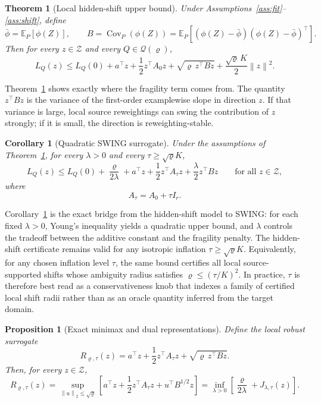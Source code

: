 \documentclass{article}
\newtheorem{theorem}{Theorem}
\newtheorem{proposition}{Proposition}
\newtheorem{corollary}{Corollary}
\newcommand{\EE}{\mathbb{E}}
\newcommand{\cQ}{\mathcal{Q}}
\newcommand{\cZ}{\mathcal{Z}}
\newcommand{\Cov}{\operatorname{Cov}}
\newcommand{\swing}{\textup{\textsc{SWING}}}
\newcommand{\norm}[1]{\left\lVert #1 \right\rVert}
\newcommand{\bracks}[1]{\left[ #1 \right]}
\begin{document}
\begin{theorem}[Local hidden-shift upper bound]
\label{thm:robust_bound}
Under Assumptions~\ref{ass:fit}--\ref{ass:shift}, define
\[
\bar\phi = \EE_P[\phi(Z)],
\qquad
B = \Cov_P(\phi(Z))
=
\EE_P\bracks{(\phi(Z)-\bar\phi)(\phi(Z)-\bar\phi)^\top}.
\]
Then for every \(z\in\cZ\) and every \(Q\in\cQ(\varrho)\),
\[
L_Q(z)
\le
L_Q(0)
+
a^\top z + \frac12 z^\top A_0 z
+
\sqrt{\varrho\, z^\top B z}
+
\frac{\sqrt{\varrho}\,K}{2}\norm{z}^2.
\]
\end{theorem}

Theorem~\ref{thm:robust_bound} shows exactly where the fragility term comes from. The quantity \(z^\top B z\) is the variance of the first-order examplewise slope in direction \(z\). If that variance is large, local source reweightings can swing the contribution of \(z\) strongly; if it is small, the direction is reweighting-stable.

\begin{corollary}[Quadratic \swing{} surrogate]
\label{cor:quadratic_majorizer}
Under the assumptions of Theorem~\ref{thm:robust_bound}, for every \(\lambda>0\) and every \(\tau\ge \sqrt{\varrho}K\),
\[
L_Q(z)
\le
L_Q(0) + \frac{\varrho}{2\lambda}
+
a^\top z
+
\frac12 z^\top A_\tau z
+
\frac{\lambda}{2} z^\top B z
\qquad
\text{for all } z\in\cZ,
\]
where
\[
A_\tau = A_0 + \tau I_r.
\]
\end{corollary}

Corollary~\ref{cor:quadratic_majorizer} is the exact bridge from the hidden-shift model to \swing{}: for each fixed \(\lambda>0\), Young's inequality yields a quadratic upper bound, and \(\lambda\) controls the tradeoff between the additive constant and the fragility penalty. The hidden-shift certificate remains valid for any isotropic inflation \(\tau\ge \sqrt{\varrho}K\). Equivalently, for any chosen inflation level \(\tau\), the same bound certifies all local source-supported shifts whose ambiguity radius satisfies \(\varrho \le (\tau/K)^2\). In practice, \(\tau\) is therefore best read as a conservativeness knob that indexes a family of certified local shift radii rather than as an oracle quantity inferred from the target domain.

\begin{proposition}[Exact minimax and dual representations]
\label{prop:minimax}
Define the local robust surrogate
\[
R_{\varrho,\tau}(z)
=
a^\top z + \frac12 z^\top A_\tau z + \sqrt{\varrho\, z^\top B z}.
\]
Then, for every \(z\in\cZ\),
\[
R_{\varrho,\tau}(z)
=
\sup_{\norm{u}_2\le \sqrt{\varrho}}
\bracks{
a^\top z + \frac12 z^\top A_\tau z + u^\top B^{1/2} z
}
=
\inf_{\lambda>0}
\bracks{
\frac{\varrho}{2\lambda} + J_{\lambda,\tau}(z)
}.
\]
\end{proposition}
\end{document}
